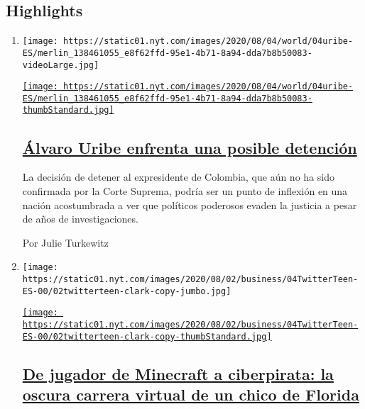 \hypertarget{highlights}{%
\subsection{Highlights}\label{highlights}}

\begin{enumerate}
\def\labelenumi{\arabic{enumi}.}
\item
  \texttt{[image: https://static01.nyt.com/images/2020/08/04/world/04uribe-ES/merlin\_138461055\_e8f62ffd-95e1-4b71-8a94-dda7b8b50083-videoLarge.jpg]}

  \href{/es/2020/08/04/espanol/america-latina/alvaro-uribe-detencion-colombia.html}{\texttt{[image: https://static01.nyt.com/images/2020/08/04/world/04uribe-ES/merlin\_138461055\_e8f62ffd-95e1-4b71-8a94-dda7b8b50083-thumbStandard.jpg]}}

  \hypertarget{uxe1lvaro-uribe-enfrenta-una-posible-detenciuxf3n}{%
  \subsection{\texorpdfstring{\href{/es/2020/08/04/espanol/america-latina/alvaro-uribe-detencion-colombia.html}{Álvaro
  Uribe enfrenta una posible
  detención}}{Álvaro Uribe enfrenta una posible detención}}\label{uxe1lvaro-uribe-enfrenta-una-posible-detenciuxf3n}}

  La decisión de detener al expresidente de Colombia, que aún no ha sido
  confirmada por la Corte Suprema, podría ser un punto de inflexión en
  una nación acostumbrada a ver que políticos poderosos evaden la
  justicia a pesar de años de investigaciones.

  Por Julie Turkewitz
\item
  \texttt{[image: https://static01.nyt.com/images/2020/08/02/business/04TwitterTeen-ES-00/02twitterteen-clark-copy-jumbo.jpg]}

  \href{/es/2020/08/04/espanol/negocios/joven-florida-hacker-twitter.html}{\texttt{[image: https://static01.nyt.com/images/2020/08/02/business/04TwitterTeen-ES-00/02twitterteen-clark-copy-thumbStandard.jpg]}}

  \hypertarget{de-jugador-de-minecraft-a-ciberpirata-la-oscura-carrera-virtual-de-un-chico-de-florida}{%
  \subsection{\texorpdfstring{\href{/es/2020/08/04/espanol/negocios/joven-florida-hacker-twitter.html}{De
  jugador de Minecraft a ciberpirata: la oscura carrera virtual de un
  chico de
  Florida}}{De jugador de Minecraft a ciberpirata: la oscura carrera virtual de un chico de Florida}}\label{de-jugador-de-minecraft-a-ciberpirata-la-oscura-carrera-virtual-de-un-chico-de-florida}}


\end{enumerate}
